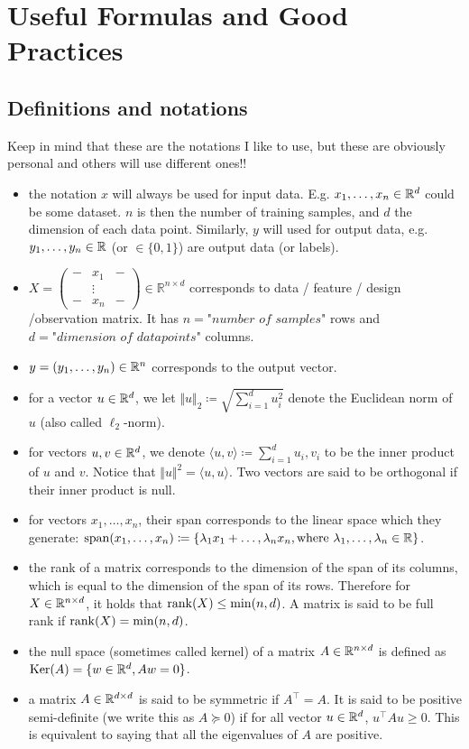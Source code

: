 \section{Useful Formulas and Good Practices}

\subsection{Definitions and notations}

Keep in mind that these are the notations I like to use, but these are obviously personal and others will use different ones!!
\begin{itemize}
    \item the notation $x$ will always be used for input data. E.g. $x_1, \dots, x_n \in \mathbb{R}^d$ could be some dataset. $n$ is then the number of training samples, and $d$ the dimension of each data point. Similarly, $y$ will used for output data, e.g. $y_1, \dots, y_n \in \mathbb{R}$ (or $\in \{0, 1\}$) are output data (or labels).
    \item $X = \begin{pmatrix}
- & x_1 & - \\
  & \vdots &  \\
- & x_n & -
\end{pmatrix}
\in \mathbb{R}^{n \times d}$ corresponds to data / feature / design /observation matrix. It has $n = \textit{"number \ of \ samples"}$ rows and $d = \textit{"dimension \ of \ datapoints"}$ columns.
    \item $y = (y_1, \dots, y_n) \in \mathbb{R}^{n}$ corresponds to the output vector.
    \item for a vector $u \in \mathbb{R}^d$, we let $\Vert u \Vert_2 \coloneqq \sqrt{\sum_{i = 1}^d u_i^2}$ denote the Euclidean norm of $u$ (also called $\ell_2$-norm).
    \item for vectors $u, v \in \mathbb{R}^d$, we denote $\langle u, v \rangle \coloneqq \sum_{i = 1}^d u_i, v_i$ to be the inner product of $u$ and $v$. Notice that $\Vert u \Vert^2 = \langle u, u \rangle$. Two vectors are said to be orthogonal if their inner product is null.
    \item for vectors $x_1, \dots, x_n$, their span corresponds to the linear space which they generate: $\mathrm{span}(x_1, \dots, x_n) \coloneqq \{ \lambda_1 x_1 + \dots, \lambda_n x_n , \text{where} \  \lambda_1, \dots, \lambda_n \in \mathbb{R} \}$.
    \item the rank of a matrix corresponds to the dimension of the span of its columns, which is equal to the dimension of the span of its rows. Therefore for $X \in \mathbb{R}^{n \times d}$, it holds that $\rank(X) \leq \min(n, d)$. A matrix is said to be full rank if $\rank(X) = \min(n, d)$.
    \item the null space (sometimes called kernel) of a matrix $A \in \mathbb{R}^{n \times d}$ is defined as $\mathrm{Ker}(A) = \{ w \in \mathbb{R}^d, A w = 0 \}$.
    \item a matrix $A \in \mathbb{R}^{d \times d}$ is said to be symmetric if $A^{\top} = A$. It is said to be positive semi-definite (we write this as  $A \succeq 0$) if for all vector $u \in \mathbb{R}^d$, $u^\top A u \geq 0$. This is equivalent to saying that all the eigenvalues of $A$ are positive. 
\end{itemize}

